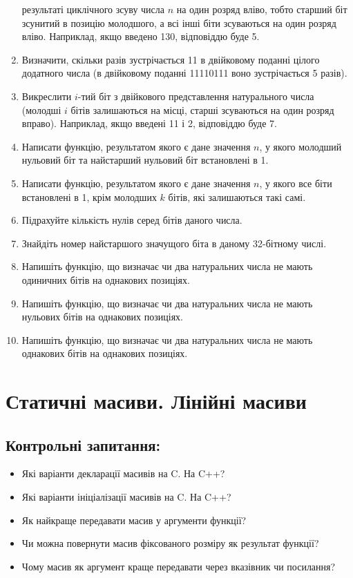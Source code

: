 \documentclass[a5paper,titlepage,openany,twoside,
]
{book_unv}%
\begin{document}
\begin{enumerate}
  результаті циклічного зсуву числа $n$ на один розряд вліво, тобто
  старший біт зсунитий в позицію молодшого, а всі інші біти зсуваються
  на один розряд вліво. Наприклад, якщо введено 130, відповіддю буде 5.
\item
  Визначити, скільки разів зустрічається 11 в двійковому поданні цілого
  додатного числа (в двійковому поданні 11110111 воно зустрічається 5
  разів).
\item
  Викреслити $i$-тий біт з двійкового представлення натурального числа
  (молодші $i$ бітів залишаються на місці, старші зсуваються на один
  розряд вправо). Наприклад, якщо введені 11 і 2, відповіддю буде 7.
\item
  Написати функцію, результатом якого є дане значення $n$, у якого 
молодший нульовий біт та найстарший нульовий біт встановлені в 1.
\item
  Написати функцію, результатом якого є дане значення $n$, у якого все
  біти встановлені в 1, крім молодших $k$ бітів, які залишаються такі самі.
\item
  Підрахуйте кількість нулів серед бітів даного числа.
\item
  Знайдіть номер найстаршого значущого біта в даному 32-бітному числі.
\item
  Напишіть функцію, що визначає чи два натуральних числа не мають
  одиничних бітів на однакових позиціях.
\item
  Напишіть функцію, що визначає чи два натуральних числа не мають
  нульових бітів на однакових позиціях.
\item
  Напишіть функцію, що визначає чи два натуральних числа не мають
  однакових бітів на однакових позиціях.
\end{enumerate}


\chapter{ Статичні масиви. Лінійні масиви }
%

\section{Контрольні запитання:}
\begin{itemize}
\item
  Які варіанти декларації масивів на C. На C++?
\item
  Які варіанти ініціалізації масивів на C. На C++?
\item
  Як найкраще передавати масив у аргументи функції?
\item
  Чи можна повернути масив фіксованого розміру як результат функції?
\item
  Чому масив як аргумент краще передавати через вказівник чи посилання?

\end{itemize}
\end{document}
